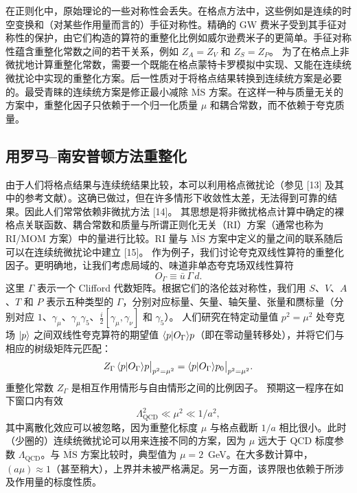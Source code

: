 在正则化中，原始理论的一些对称性会丢失。在格点方法中，这些例如是连续的时空变换和（对某些作用量而言的）手征对称性。精确的 GW 费米子受到其手征对称性的保护，由它们构造的算符的重整化比例如威尔逊费米子的更简单。手征对称性蕴含重整化常数之间的若干关系，例如 $Z_A = Z_V$ 和 $Z_S = Z_P$。
为了在格点上非微扰地计算重整化常数，需要一个既能在格点蒙特卡罗模拟中实现、又能在连续统微扰论中实现的重整化方案。后一性质对于将格点结果转换到连续统方案是必要的。最受青睐的连续统方案是修正最小减除 $\overline{\mathrm{MS}}$ 方案。在这样一种与质量无关的方案中，重整化因子只依赖于一个归一化质量 $\mu$ 和耦合常数，而不依赖于夸克质量。

\subsection{用罗马–南安普顿方法重整化}
由于人们将格点结果与连续统结果比较，本可以利用格点微扰论（参见 [13] 及其中的参考文献）。这确已做过，但在许多情形下收敛性太差，无法得到可靠的结果。因此人们常常依赖非微扰方法 [14]。
其思想是将非微扰格点计算中确定的裸格点关联函数、耦合常数和质量与所谓正则化无关（RI）方案（通常也称为 RI/MOM 方案）中的量进行比较。RI 量与 $\overline{\mathrm{MS}}$ 方案中定义的量之间的联系随后可以在连续统微扰论中建立 [15]。
作为例子，我们讨论夸克双线性算符的重整化因子。更明确地，让我们考虑局域的、味道非单态夸克场双线性算符
\begin{equation}
O_\Gamma \equiv \bar{u}\,\Gamma\, d .
\end{equation}
这里 $\Gamma$ 表示一个 Clifford 代数矩阵。根据它们的洛伦兹对称性，我们用 $S$、$V$、$A$、$T$ 和 $P$ 表示五种类型的 $\Gamma$，分别对应标量、矢量、轴矢量、张量和赝标量（分别对应 $1$、$\gamma_\mu$、$\gamma_\mu\gamma_5$、$\frac{i}{2}[\gamma_\mu, \gamma_\nu]$ 和 $\gamma_5$）。
人们研究在特定动量值 $p^2 = \mu^2$ 处夸克场 $|p\rangle$ 之间双线性夸克算符的期望值 $\langle p|O_\Gamma\rangle{p}$（即在零动量转移处），并将它们与相应的树级矩阵元匹配：
\begin{equation}
Z_\Gamma\, \langle p|O_\Gamma\rangle{p}\big|_{p^2 = \mu^2} = \langle p|O_\Gamma\rangle{p}_0\big|_{p^2 = \mu^2} .
\end{equation}
重整化常数 $Z_\Gamma$ 是相互作用情形与自由情形之间的比例因子。
预期这一程序在如下窗口内有效
\begin{equation}
\Lambda_{\mathrm{QCD}}^2 \ll \mu^2 \ll 1/a^2 ,
\end{equation}
其中离散化效应可以被忽略，因为重整化标度 $\mu$ 与格点截断 $1/a$ 相比很小。此时（少圈的）连续统微扰论可以用来连接不同的方案，因为 $\mu$ 远大于 QCD 标度参数 $\Lambda_{\mathrm{QCD}}$。与 $\overline{\mathrm{MS}}$ 方案比较时，典型值为 $\mu = 2$~GeV。在大多数计算中，$(a\mu) \approx 1$（甚至稍大），上界并未被严格满足。另一方面，该界限也依赖于所涉及作用量的标度性质。
